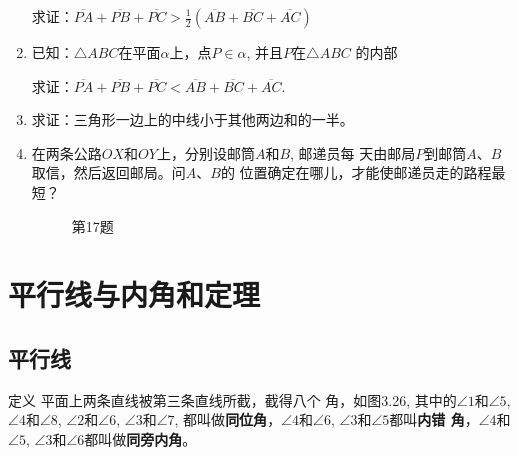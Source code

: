 \begin{enumerate}
求证：$\overline{PA}+\overline{PB}+\overline{PC}>\frac{1}{2}(\overline{AB}+\overline{BC}+\overline{AC})$
\item 已知：$\triangle ABC$在平面$\alpha$上，点$P\in\alpha$, 并且$P$在$\triangle ABC$
的内部

求证：$\overline{PA}+\overline{PB}+\overline{PC}<\overline{AB}+\overline{BC}+\overline{AC}$.
\item 求证：三角形一边上的中线小于其他两边和的一半。
\item 在两条公路$OX$和$OY$上，分别设邮筒$A$和$B$, 邮递员每
天由邮局$P$到邮筒$A$、$B$取信，然后返回邮局。问$A$、$B$的
位置确定在哪儿，才能使邮递员走的路程最短？

\begin{figure}[htbp]
    \centering
{}
    \caption*{第17题}
\end{figure}
\end{enumerate}

\section{平行线与内角和定理}

\subsection{平行线}
\begin{blk}
    {定义}
平面上两条直线被第三条直线所截，截得八个
角，如图3.26, 其中的$\angle 1$和$\angle 5$, $\angle 4$和$\angle 8$, $\angle 2$和$\angle 6$, 
$\angle 3$和$\angle 7$, 都叫做\textbf{同位角}，$\angle 4$和$\angle 6$, $\angle 3$和$\angle 5$都叫\textbf{内错
角}，$\angle 4$和$\angle 5$, $\angle 3$和$\angle 6$都叫做\textbf{同旁内角}。
\end{blk}

